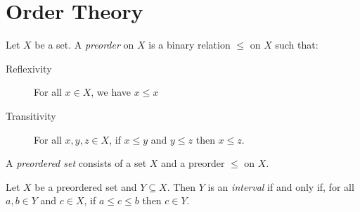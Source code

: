 \section{Order Theory}

\begin{definition}[Preorder]
    Let $X$ be a set. A \emph{preorder} on $X$ is a binary relation $\leq$ on $X$ such that:
    \begin{description}
        \item[Reflexivity] For all $x \in X$, we have $x \leq x$
        \item[Transitivity] For all $x, y, z \in X$, if $x \leq y$ and $y \leq z$ then $x \leq z$.  
    \end{description}

    A \emph{preordered set} consists of a set $X$ and a preorder $\leq$ on $X$.
\end{definition}

\begin{definition}[Interval]
    Let $X$ be a preordered set and $Y \subseteq X$. Then $Y$ is an \emph{interval} if and only if, for
    all $a, b \in Y$ and $c \in X$, if $a \leq c \leq b$ then $c \in Y$.
\end{definition}